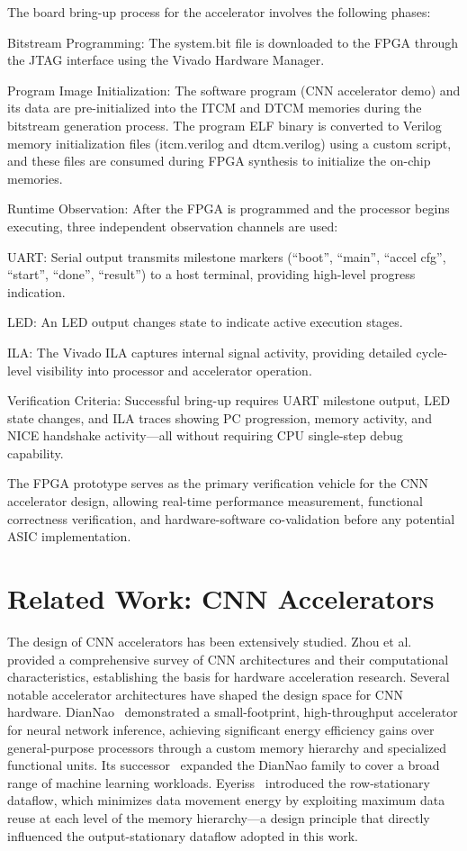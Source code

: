The board bring-up process for the accelerator involves the following phases:


Bitstream Programming: The system.bit file is downloaded to the FPGA through the JTAG interface using the Vivado Hardware Manager.


Program Image Initialization: The software program (CNN accelerator demo) and its data are pre-initialized into the ITCM and DTCM memories during the bitstream generation process. The program ELF binary is converted to Verilog memory initialization files (itcm.verilog and dtcm.verilog) using a custom script, and these files are consumed during FPGA synthesis to initialize the on-chip memories.


Runtime Observation: After the FPGA is programmed and the processor begins executing, three independent observation channels are used:


UART: Serial output transmits milestone markers (“boot”, “main”, “accel cfg”, “start”, “done”, “result”) to a host terminal, providing high-level progress indication.


LED: An LED output changes state to indicate active execution stages.


ILA: The Vivado ILA captures internal signal activity, providing detailed cycle-level visibility into processor and accelerator operation.


Verification Criteria: Successful bring-up requires UART milestone output, LED state changes, and ILA traces showing PC progression, memory activity, and NICE handshake activity—all without requiring CPU single-step debug capability.


The FPGA prototype serves as the primary verification vehicle for the CNN accelerator design, allowing real-time performance measurement, functional correctness verification, and hardware-software co-validation before any potential ASIC implementation.

\section{Related Work: CNN Accelerators}\label{sec:2_5}

The design of CNN accelerators has been extensively studied. Zhou et al.~\cite{zhou2017cnn} provided a comprehensive survey of CNN architectures and their computational characteristics, establishing the basis for hardware acceleration research. Several notable accelerator architectures have shaped the design space for CNN hardware. DianNao~\cite{DIANNAO} demonstrated a small-footprint, high-throughput accelerator for neural network inference, achieving significant energy efficiency gains over general-purpose processors through a custom memory hierarchy and specialized functional units. Its successor~\cite{diannao2016} expanded the DianNao family to cover a broad range of machine learning workloads. Eyeriss~\cite{EYERISS} introduced the row-stationary dataflow, which minimizes data movement energy by exploiting maximum data reuse at each level of the memory hierarchy---a design principle that directly influenced the output-stationary dataflow adopted in this work.


